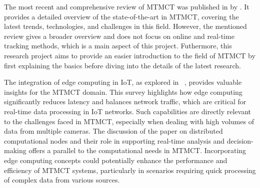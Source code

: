 The most recent and comprehensive review of MTMCT was published in \citeyear{Amosa23} by \textcite{Amosa23}. It provides a detailed overview of the state-of-the-art in MTMCT, covering the latest trends, technologies, and challenges in this field. However, the mentioned review gives a broader overview and does not focus on online and real-time tracking methods, which is a main aspect of this project. Futhermore, this research project aims to provide an easier introduction to the field of MTMCT by first explaining the basics before diving into the details of the latest research.

The integration of edge computing in IoT, as explored in ~\cite{Yu17}, provides valuable insights for the MTMCT domain. This survey highlights how edge computing significantly reduces latency and balances network traffic, which are critical for real-time data processing in IoT networks. Such capabilities are directly relevant to the challenges faced in MTMCT, especially when dealing with high volumes of data from multiple cameras. The discussion of the paper on distributed computational nodes and their role in supporting real-time analysis and decision-making offers a parallel to the computational needs in MTMCT. Incorporating edge computing concepts could potentially enhance the performance and efficiency of MTMCT systems, particularly in scenarios requiring quick processing of complex data from various sources.